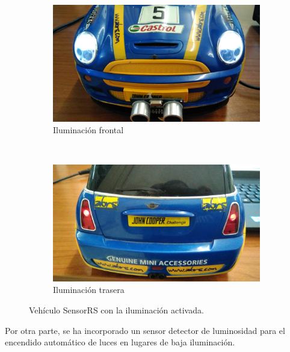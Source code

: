 \begin{figure}[H]
    \centering
    \begin{subfigure}[b]{0.4\textwidth}
        \includegraphics[width=\textwidth]{imagenes/robot/luces_delanteras.jpg}
        \caption{Iluminación frontal}
        \label{fig:gull}
    \end{subfigure}
    ~ %
    \begin{subfigure}[b]{0.4\textwidth}
        \includegraphics[width=\textwidth]{imagenes/robot/luces_traseras.jpeg}
        \caption{Iluminación trasera}
        \label{fig:tiger}
    \end{subfigure}
    \caption{Vehículo SensorRS con la iluminación activada.}\label{fig:iluminacion}
\end{figure}


Por otra parte, se ha incorporado un sensor detector de luminosidad para el encendido automático de luces en lugares de baja iluminación.\\


